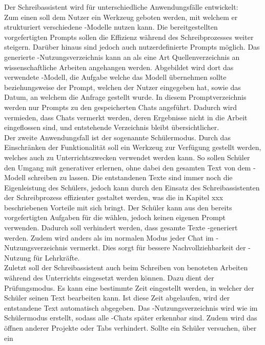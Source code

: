 \documentclass[../main.tex]{subfiles}
\begin{document}
Der Schreibassistent wird für unterschiedliche Anwendungsfälle entwickelt: \\
Zum einen soll dem Nutzer ein Werkzeug geboten werden, mit welchem er strukturiert verschiedene -Modelle nutzen kann. Die bereitgestellten vorgefertigten Prompts sollen die 
Effizienz während des Schreibprozesses weiter steigern. Darüber hinaus sind jedoch auch nutzerdefinierte Prompts möglich. Das generierte -Nutzungsverzeichnis kann an als eine Art 
Quellenverzeichnis an wissenschaftliche Arbeiten angehangen werden. Abgebildet wird dort das verwendete -Modell, die Aufgabe welche das Modell 
übernehmen sollte beziehungsweise der Prompt, welchen der Nutzer eingegeben hat, sowie das Datum, an welchem die Anfrage gestellt wurde. In diesem Promptverzeichnis werden nur 
Prompts zu den gespeicherten Chats angeführt. Dadurch wird vermieden, dass Chats vermerkt werden, deren Ergebnisse nicht in die Arbeit eingeflossen sind, und entstehende Verzeichnis 
bleibt übersichtlicher.\\ 
Der zweite Anwendungsfall ist der sogenannte Schülermodus. Durch das Einschränken der Funktionalität soll ein Werkzeug zur Verfügung gestellt werden, welches auch zu 
Unterrichtszwecken verwendet werden kann. So sollen Schüler den Umgang mit generativer  erlernen, ohne dabei den gesamten Text von dem -Modell schreiben zu lassen. Die 
entstandenen Texte sind immer noch die Eigenleistung des Schülers, jedoch kann durch den Einsatz des Schreibassistenten der Schreibprozess effizienter gestaltet werden, was die in 
Kapitel xxx beschriebenen Vorteile mit sich bringt. Der Schüler kann aus den bereits vorgefertigten Aufgaben für die  wählen, jedoch keinen eigenen Prompt verwenden. Dadurch soll 
verhindert werden, dass gesamte Texte -generiert werden. Zudem wird anders als im normalen Modus jeder Chat im -Nutzungsverzeichnis vermerkt. Dies sorgt für bessere 
Nachvollziehbarkeit der -Nutzung für Lehrkräfte.\\ 
Zuletzt soll der Schreibassistent auch beim Schreiben von benoteten Arbeiten während des Unterrichts eingesetzt werden können. Dazu dient der Prüfungsmodus. Es kann eine bestimmte 
Zeit eingestellt werden, in welcher der Schüler seinen Text bearbeiten kann. Ist diese Zeit abgelaufen, wird der entstandene Text automatisch abgegeben. Das -Nutzungsverzeichnis 
wird wie im Schülermodus erstellt, sodass alle -Chats später erkennbar sind. Zudem wird das öffnen anderer Projekte oder Tabs verhindert. Sollte ein Schüler versuchen, über ein 
\end{document}
